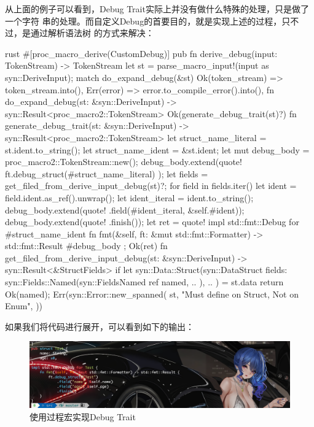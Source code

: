 从上面的例子可以看到，Debug Trait实际上并没有做什么特殊的处理，只是做了一个字符
串的处理。而自定义Debug的首要目的，就是实现上述的过程，只不过，是通过解析语法树
的方式来解决：
\begin{code-block}{rust}
#[proc_macro_derive(CustomDebug)]
pub fn derive_debug(input: TokenStream) -> TokenStream {
    let st = parse_macro_input!(input as syn::DeriveInput);
    match do_expand_debug(&st) {
        Ok(token_stream) => token_stream.into(),
        Err(error) => error.to_compile_error().into(),
    }
}
fn do_expand_debug(st: &syn::DeriveInput) -> syn::Result<proc_macro2::TokenStream> {
    Ok(generate_debug_trait(st)?)
}
fn generate_debug_trait(st: &syn::DeriveInput) -> syn::Result<proc_macro2::TokenStream> {
    let struct_name_literal = st.ident.to_string();
    let struct_name_ident = &st.ident;
    let mut debug_body = proc_macro2::TokenStream::new();
    debug_body.extend(quote! {
        ft.debug_struct(#struct_name_literal)
    });
    let fields = get_filed_from_derive_input_debug(st)?;
    for field in fields.iter() {
        let ident = field.ident.as_ref().unwrap();
        let ident_iteral = ident.to_string();
        debug_body.extend(quote! {.field(#ident_iteral, &self.#ident)});
    }
    debug_body.extend(quote! {.finish()});
    let ret = quote! {
        impl std::fmt::Debug for #struct_name_ident {
            fn fmt(&self, ft: &mut std::fmt::Formatter) -> std::fmt::Result {
                #debug_body
            }
        }
    };
    Ok(ret)
}
fn get_filed_from_derive_input_debug(st: &syn::DeriveInput) -> syn::Result<&StructFields> {
    if let syn::Data::Struct(syn::DataStruct {
        fields: syn::Fields::Named(syn::FieldsNamed { ref named, .. }),
        ..
    }) = st.data
    {
        return Ok(named);
    }
    Err(syn::Error::new_spanned(
        st,
        "Must define on Struct, Not on Enum",
    ))
}
\end{code-block}
如果我们将代码进行展开，可以看到如下的输出：
\begin{figure}[H]
  \centering
  \includegraphics[width=\linewidth]{rust_macro_impl_debug.png}
  \caption{使用过程宏实现Debug Trait}
  \label{fig:rust_macro_impl_debug}
\end{figure}

